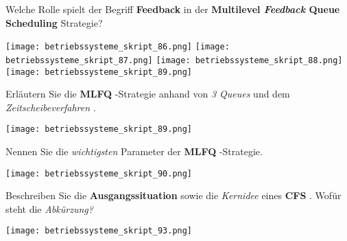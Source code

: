 \documentclass{article}
\begin{document}
\begin{tcolorbox}[colback=white!10!white,colframe=lightgray!75!black,
  savelowerto=\jobname_ex.tex]

\begin{center}
Welche Rolle spielt der Begriff 
\textbf{Feedback
} in der 
\textbf{Multilevel 
\textit{Feedback
} Queue Scheduling
} Strategie?

\end{center}

\tcblower

\justifying
\texttt{[image: betriebssysteme\_skript\_86.png]}
\texttt{[image: betriebssysteme\_skript\_87.png]}
\texttt{[image: betriebssysteme\_skript\_88.png]}
\texttt{[image: betriebssysteme\_skript\_89.png]}

\end{tcolorbox}
\begin{tcolorbox}[colback=white!10!white,colframe=lightgray!75!black,
  savelowerto=\jobname_ex.tex]

\begin{center}
Erläutern Sie die 
\textbf{MLFQ
}-Strategie anhand von 
\textit{3 Queues
} und dem 
\textit{Zeitscheibeverfahren
}.

\end{center}

\tcblower

\justifying
\texttt{[image: betriebssysteme\_skript\_89.png]}

\end{tcolorbox}
\begin{tcolorbox}[colback=white!10!white,colframe=lightgray!75!black,
  savelowerto=\jobname_ex.tex]

\begin{center}
Nennen Sie die 
\textit{wichtigsten
} Parameter der 
\textbf{MLFQ
}-Strategie.

\end{center}

\tcblower

\justifying
\texttt{[image: betriebssysteme\_skript\_90.png]}

\end{tcolorbox}
\begin{tcolorbox}[colback=white!10!white,colframe=lightgray!75!black,
  savelowerto=\jobname_ex.tex]

\begin{center}
Beschreiben Sie die 
\textbf{Ausgangssituation
} sowie die 
\textit{Kernidee
} eines 
\textbf{CFS
}. Wofür steht die 
\textit{Abkürzung?
}
\end{center}

\tcblower

\justifying
\texttt{[image: betriebssysteme\_skript\_93.png]}

\end{tcolorbox}
\end{document}
